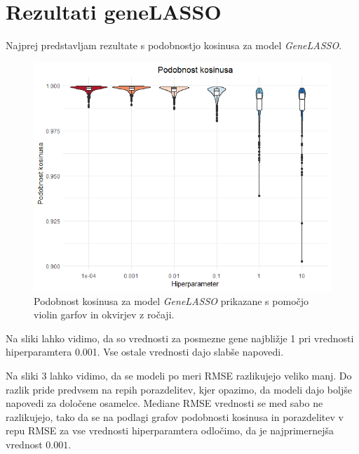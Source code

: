 \documentclass[onecolumn]{report}
\begin{document}
\section*{Rezultati geneLASSO}

Najprej predstavljam rezultate s podobnostjo kosinusa za model \emph{GeneLASSO}.

\begin{figure}[!htb]
	\centering
	\includegraphics[width=1.1\linewidth]{fig/cosine.png}
	\caption{Podobnost kosinusa za model \emph{GeneLASSO} prikazane s pomočjo violin garfov in okvirjev z ročaji.}
	\label{fig:vqvae}
\end{figure}

Na sliki lahko vidimo, da so vrednosti za posmezne gene najbližje 1 pri vrednosti hiperparamtera 0.001. Vse ostale vrednosti dajo slabše napovedi. 

Na sliki 3 lahko vidimo, da se modeli po meri RMSE razlikujejo veliko manj. Do razlik pride predvsem na repih porazdelitev, kjer opazimo, da modeli dajo boljše napovedi za določene osamelce. Mediane RMSE vrednosti se med sabo ne razlikujejo, tako da se na podlagi grafov podobnosti kosinusa in porazdelitev v repu RMSE za vse vrednosti hiperparamtera odločimo, da je najprimernejša vrednost $0.001$. 
\end{document}

